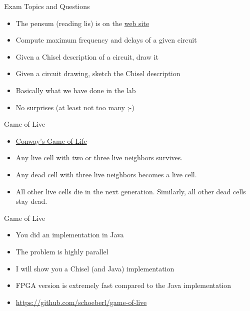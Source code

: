\begin{frame}[fragile]{Exam Topics and Questions}
\begin{itemize}
\item The pensum (reading lis) is on the \href{http://www2.imm.dtu.dk/courses/02139/}{web site}
\item Compute maximum frequency and delays of a given circuit
\item Given a Chisel description of a circuit, draw it
\item Given a circuit drawing, sketch the Chisel description
\item Basically what we have done in the lab
\item No surprises (at least not too many ;-)
\end{itemize}
\end{frame}

\begin{frame}[fragile]{Game of Live}
\begin{itemize}
\item \href{https://en.wikipedia.org/wiki/Conway\%27s_Game_of_Life}{Conway's Game of Life}
\item Any live cell with two or three live neighbors survives.
\item Any dead cell with three live neighbors becomes a live cell.
\item All other live cells die in the next generation. Similarly, all other dead cells stay dead.
\end{itemize}
\end{frame}

\begin{frame}[fragile]{Game of Live}
\begin{itemize}
\item You did an implementation in Java
\item The problem is highly parallel
\item I will show you a Chisel (and Java) implementation
\item FPGA version is extremely fast compared to the Java implementation
\item \url{https://github.com/schoeberl/game-of-live}
\end{itemize}
\end{frame}

